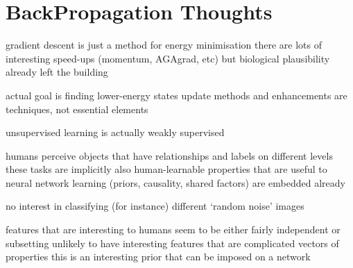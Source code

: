 \documentclass[citeauthoryear]{llncs}
\begin{document}
\section{BackPropagation Thoughts}
  gradient descent is just a method for energy minimisation
    there are lots of interesting speed-ups (momentum, AGAgrad, etc)
      but biological plausibility already left the building
      
    actual goal is finding lower-energy states
      update methods and enhancements are techniques, not essential elements



unsupervised learning is actually weakly supervised 

  humans perceive objects that have relationships and labels on different levels
    these tasks are implicitly also human-learnable
    properties that are useful to neural network learning (priors, causality, shared factors) are embedded already
    
  no interest in classifying (for instance) different `random noise' images
  
  features that are interesting to humans seem to be either fairly independent or subsetting
    unlikely to have interesting features that are complicated vectors of properties
    this is an interesting prior that can be imposed on a network
\end{document}
